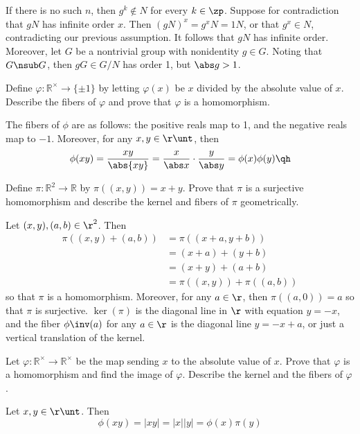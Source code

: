 \begin{problems}
\begin{sol}
        If there is no such $n$, then $g^k \not\in N$ for every $k \in \zp$. Suppose for contradiction that $gN$ has infinite order $x$. Then $(gN)^x = g^xN = 1N$, or that $g^x \in N$, contradicting our previous assumption. It follows that $gN$ has infinite order. Moreover, let $G$ be a nontrivial group with nonidentity $g \in G$. Noting that $G \nsub G$, then $gG \in G/N$ has order 1, but $\abs g > 1$.
    \end{sol}
    \item Define $\varphi : \mathbb{R}^{\times} \to \{\pm 1\}$ by letting $\varphi(x)$ be $x$ divided by the absolute value of $x$. Describe the fibers of $\varphi$ and prove that $\varphi$ is a homomorphism.
    \begin{sol}
        The fibers of $\phi$ are as follows: the positive reals map to 1, and the negative reals map to $-1$. Moreover, for any $x, y \in \r\unt$, then
        \[\phi(xy) = \frac{xy}{\abs{xy}} = \frac{x}{\abs x} \cdot \frac{y}{\abs y} = \phi(x)\phi(y) \qh\]
    \end{sol}
    \item Define $\pi : \mathbb{R}^2 \to \mathbb{R}$ by $\pi((x,y)) = x + y$. Prove that $\pi$ is a surjective homomorphism and describe the kernel and fibers of $\pi$ geometrically.
    \begin{sol}
        Let $(x, y), (a, b) \in \r^2$. Then
        \begin{align*}
            \pi((x, y) + (a, b)) & = \pi((x + a, y + b)) \\
            & = (x + a) + (y + b) \\
            & = (x + y) + (a + b) \\
            & = \pi((x, y)) + \pi((a, b))
        \end{align*}
        so that $\pi$ is a homomorphism. Moreover, for any $a \in \r$, then $\pi((a, 0)) = a$ so that $\pi$ is surjective. $\ker(\pi)$ is the diagonal line in $\r$ with equation $y = -x$, and the fiber $\phi\inv(a)$ for any $a \in \r$ is the diagonal line $y = -x + a$, or just a vertical translation of the kernel.
    \end{sol}
    \item Let $\varphi : \mathbb{R}^{\times} \to \mathbb{R}^{\times}$ be the map sending $x$ to the absolute value of $x$. Prove that $\varphi$ is a homomorphism and find the image of $\varphi$. Describe the kernel and the fibers of $\varphi$.
    \begin{sol}
        Let $x, y \in \r\unt$. Then
        \[\phi(xy) = |xy| = |x||y| = \phi(x)\pi(y)\]

\end{sol}
\end{problems}
